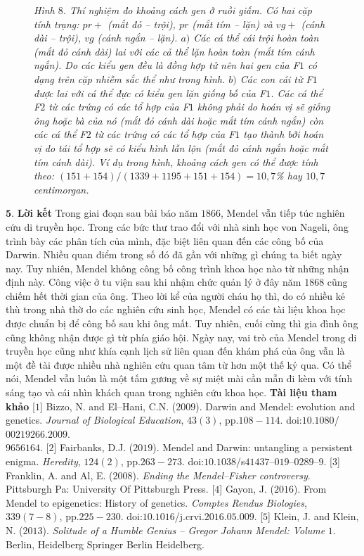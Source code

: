 \begin{multicols}{2}
\begin{figure}[H]
		\caption{\small\textit{\color{timhieukhoahoc}Hình $8$. Thí nghiệm đo khoảng cách gen ở ruồi giấm. Có hai cặp tính trạng: $pr+$ (mắt đỏ -- trội), $pr$ (mắt tím -- lặn) và $vg+$ (cánh dài -- trội), $vg$ (cánh ngắn -- lặn). $a)$ Các cá thể cái trội hoàn toàn (mắt đỏ cánh dài) lai với các cả thể lặn hoàn toàn (mắt tím cánh ngắn). Do các kiểu gen đều là đồng hợp tử nên hai gen của F$1$ có dạng trên cặp nhiễm sắc thể như trong hình. $b)$ Các con cái từ F$1$ được lai với cá thể đực có kiểu gen lặn giống bố của F$1$. Các cá thể F$2$ từ các trứng có các tổ hợp của F$1$ không phải do hoán vị sẽ giống ông hoặc bà của nó (mắt đỏ cánh dài hoặc mắt tím cánh ngắn) còn các cá thể F$2$ từ các trứng có các tổ hợp của F$1$ tạo thành bởi hoán vị do tái tổ hợp sẽ có kiểu hình lẫn lộn (mắt đỏ cánh ngắn hoặc mắt tím cánh dài). Ví dụ trong hình, khoảng cách gen có thể được tính theo: $(151 + 154)/(1339 + 1195 + 151 +154) = 10,7$\% hay $10,7$ centimorgan.}}
		\vspace*{-10pt}
	\end{figure}
	$\pmb{5.}$ \textbf{\color{timhieukhoahoc}Lời kết}
	\vskip 0.1cm
	Trong giai đoạn sau bài báo năm $1866$, Mendel vẫn tiếp túc nghiên cứu di truyền học. Trong các bức thư trao đổi với nhà sinh học von Nageli, ông trình bày các phân tích của mình, đặc biệt liên quan đến các công bố của Darwin. Nhiều quan điểm trong số đó đã gần với những gì chúng ta biết ngày nay. Tuy nhiên, Mendel không công bố công trình khoa học nào từ những nhận định này. Công việc ở tu viện sau khi nhậm chức quản lý ở đây năm $1868$ cũng chiếm hết thời gian của ông. Theo lời kể của người cháu họ thì, do có nhiều kẻ thù trong nhà thờ do các nghiên cứu sinh học, Mendel có các tài liệu khoa học được chuẩn bị để công bố sau khi ông mất. Tuy nhiên, cuối cùng thì gia đình ông cũng không nhận được gì từ phía giáo hội.
	\vskip 0.1cm
	Ngày nay, vai trò của Mendel trong di truyền học cũng như khía cạnh lịch sử liên quan đến khám phá của ông vẫn là một đề tài được nhiều nhà nghiên cứu quan tâm từ hơn một thế kỷ qua. Có thể nói, Mendel vẫn luôn là một tấm gương về sự miệt mài cần mẫn đi kèm với tính sáng tạo và cái nhìn khách quan trong nghiên cứu khoa học.
	\vskip 0.1cm
	\textbf{\color{timhieukhoahoc}Tài liệu tham khảo}
	\vskip 0.1cm
	[$1$] Bizzo, N. and El--Hani, C.N. ($2009$). Darwin and Mendel: evolution and genetics. \textit{Journal of Biological Education}, $43(3)$, pp.$108-114$. doi:$10.1080$/$00219266$.$2009$.\\$9656164$.
	\vskip 0.1cm
	[$2$] Fairbanks, D.J. ($2019$). Mendel and Darwin: untangling a persistent enigma. \textit{Heredity}, $124(2)$, pp.$263-273$. doi:$10.1038$/s$41437$--$019$--$0289$--$9$.
	\vskip 0.1cm
	[$3$] Franklin, A. and Al, E. ($2008$). \textit{Ending the Mendel--Fisher controversy}. Pittsburgh Pa: University Of Pittsburgh Press.
	\vskip 0.1cm
	[$4$] Gayon, J. ($2016$). From Mendel to epigenetics: History of genetics. \textit{Comptes Rendus Biologies}, $339(7-8)$, pp.$225-230$. doi:$10$.$1016$/j.crvi.$2016$.$05$.$009$.
	\vskip 0.1cm
	[$5$] Klein, J. and Klein, N. ($2013$). \textit{Solitude of a Humble Genius -- Gregor Johann Mendel: Volume} $1$. Berlin, Heidelberg Springer Berlin Heidelberg.
\end{multicols}